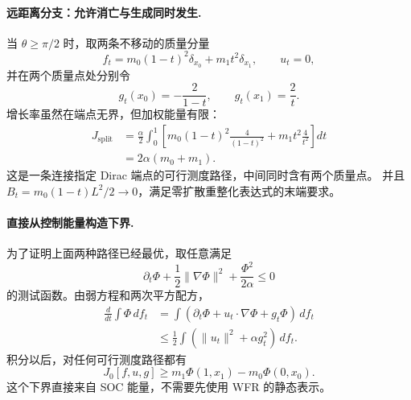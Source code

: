 \documentclass[UTF8,a4paper,11pt,fontset=fandol]{ctexart}
\begin{document}
\paragraph{远距离分支：允许消亡与生成同时发生.}
当 $\theta\ge\pi/2$ 时，取两条不移动的质量分量
\begin{equation}
f_t=m_0(1-t)^2\delta_{x_0}+m_1t^2\delta_{x_1},\qquad u_t=0,
\end{equation}
并在两个质量点处分别令
\begin{equation}
g_t(x_0)=-\frac2{1-t},\qquad g_t(x_1)=\frac2t.
\end{equation}
增长率虽然在端点无界，但加权能量有限：
\begin{equation}
\begin{aligned}
J_{\mathrm{split}}
&=\frac\alpha2\int_0^1
\left[m_0(1-t)^2\frac4{(1-t)^2}
+m_1t^2\frac4{t^2}\right]dt\\
&=2\alpha(m_0+m_1).
\end{aligned}
\label{eq:wfr-split-upper-bound}
\end{equation}
这是一条连接指定 Dirac 端点的可行测度路径，中间同时含有两个质量点。
并且 $B_t=m_0(1-t)L^2/2\to0$，满足零扩散重整化表达式的末端要求。

\paragraph{直接从控制能量构造下界.}
为了证明上面两种路径已经最优，取任意满足
\begin{equation}
\partial_t\Phi+\frac12\|\nabla\Phi\|^2
+\frac{\Phi^2}{2\alpha}\le0
\label{eq:wfr-dual-subsolution}
\end{equation}
的测试函数。由弱方程和两次平方配方，
\begin{equation}
\begin{aligned}
\frac d{dt}\int\Phi\,df_t
&=\int(\partial_t\Phi+u_t\cdot\nabla\Phi+g_t\Phi)\,df_t\\
&\le\frac12\int(\|u_t\|^2+\alpha g_t^2)\,df_t.
\end{aligned}
\end{equation}
积分以后，对任何可行测度路径都有
\begin{equation}
J_0[f,u,g]\ge m_1\Phi(1,x_1)-m_0\Phi(0,x_0).
\label{eq:wfr-action-dual-bound}
\end{equation}
这个下界直接来自 SOC 能量，不需要先使用 WFR 的静态表示。
\end{document}
